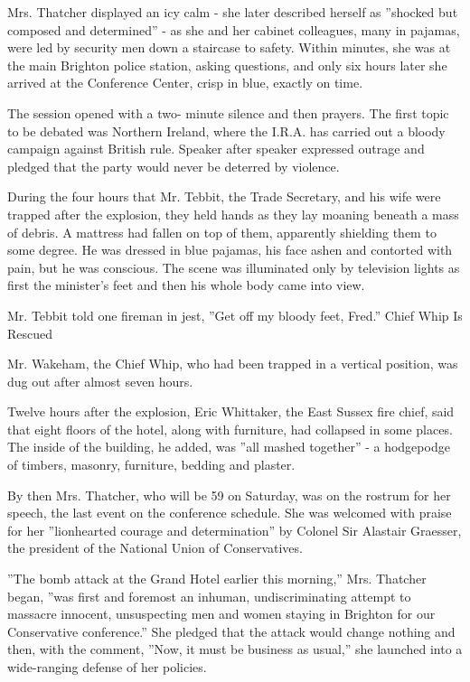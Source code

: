 Mrs. Thatcher displayed an icy calm - she later described herself as
''shocked but composed and determined'' - as she and her cabinet
colleagues, many in pajamas, were led by security men down a staircase
to safety. Within minutes, she was at the main Brighton police station,
asking questions, and only six hours later she arrived at the Conference
Center, crisp in blue, exactly on time.

The session opened with a two- minute silence and then prayers. The
first topic to be debated was Northern Ireland, where the I.R.A. has
carried out a bloody campaign against British rule. Speaker after
speaker expressed outrage and pledged that the party would never be
deterred by violence.

During the four hours that Mr. Tebbit, the Trade Secretary, and his wife
were trapped after the explosion, they held hands as they lay moaning
beneath a mass of debris. A mattress had fallen on top of them,
apparently shielding them to some degree. He was dressed in blue
pajamas, his face ashen and contorted with pain, but he was conscious.
The scene was illuminated only by television lights as first the
minister's feet and then his whole body came into view.

Mr. Tebbit told one fireman in jest, ''Get off my bloody feet, Fred.''
Chief Whip Is Rescued

Mr. Wakeham, the Chief Whip, who had been trapped in a vertical
position, was dug out after almost seven hours.

Twelve hours after the explosion, Eric Whittaker, the East Sussex fire
chief, said that eight floors of the hotel, along with furniture, had
collapsed in some places. The inside of the building, he added, was
''all mashed together'' - a hodgepodge of timbers, masonry, furniture,
bedding and plaster.

By then Mrs. Thatcher, who will be 59 on Saturday, was on the rostrum
for her speech, the last event on the conference schedule. She was
welcomed with praise for her ''lionhearted courage and determination''
by Colonel Sir Alastair Graesser, the president of the National Union of
Conservatives.

''The bomb attack at the Grand Hotel earlier this morning,'' Mrs.
Thatcher began, ''was first and foremost an inhuman, undiscriminating
attempt to massacre innocent, unsuspecting men and women staying in
Brighton for our Conservative conference.'' She pledged that the attack
would change nothing and then, with the comment, ''Now, it must be
business as usual,'' she launched into a wide-ranging defense of her
policies.

